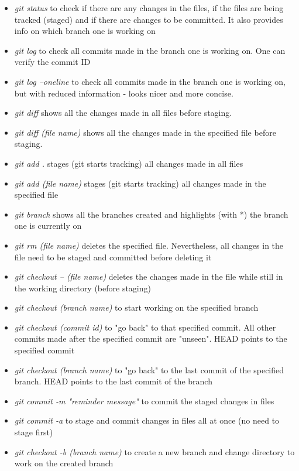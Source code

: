 \documentclass{article}
\begin{document}
\begin{itemize}
    \item \textit{git status} to check if there are any changes in the files, if the files are being tracked (staged) and if there are changes to be committed. It also provides info on which branch one is working on
    \item \textit{git log} to check all commits made in the branch one is working on. One can verify the commit ID
    \item \textit{git log --oneline} to check all commits made in the branch one is working on, but with reduced information - looks nicer and more concise. 
    \item \textit{git diff } shows all the changes made in all files before staging.
    \item \textit{git diff (file name)} shows all the changes made in the specified file before staging.
    \item \textit{git add .} stages (git starts tracking) all changes made in all files
    \item \textit{git add (file name)} stages (git starts tracking) all changes made in the specified file
    \item \textit{git branch} shows all the branches created and highlights (with *) the branch one is currently on
    \item \textit{git rm (file name)} deletes the specified file. Nevertheless, all changes in the file need to be staged and committed before deleting it
    \item \textit{git checkout -- (file name)} deletes the changes made in the file while still in the working directory (before staging) 
    \item \textit{git checkout (branch name)} to start working on the specified branch
    \item \textit{git checkout (commit id)} to "go back" to that specified commit. All other commits made after the specified commit are "unseen". HEAD points to the specified commit
    \item \textit{git checkout (branch name)} to "go back" to the last commit of the specified branch. HEAD points to the last commit of the branch
    \item \textit{git commit -m "reminder message"} to commit the staged changes in files
    \item \textit{git commit -a} to stage and commit changes in files all at once (no need to stage first)
    \item \textit{git checkout -b (branch name)} to create a new branch and change directory to work on the created branch
    
\end{itemize}
\end{document}
